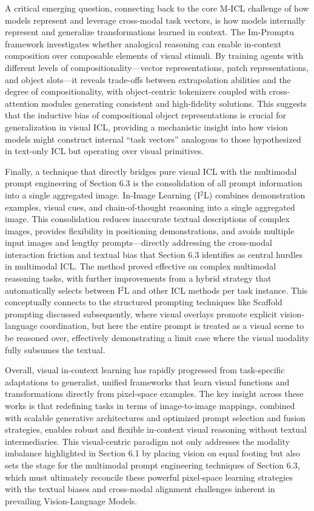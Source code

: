 \documentclass[11pt]{article}
\begin{document}
A critical emerging question, connecting back to the core M-ICL challenge of how models represent and leverage cross-modal task vectors, is how models internally represent and generalize transformations learned in context. The Im-Promptu framework \cite{ref234} investigates whether analogical reasoning can enable in-context composition over composable elements of visual stimuli. By training agents with different levels of compositionality---vector representations, patch representations, and object slots---it reveals trade-offs between extrapolation abilities and the degree of compositionality, with object-centric tokenizers coupled with cross-attention modules generating consistent and high-fidelity solutions. This suggests that the inductive bias of compositional object representations is crucial for generalization in visual ICL, providing a mechanistic insight into how vision models might construct internal ``task vectors'' analogous to those hypothesized in text-only ICL but operating over visual primitives.

Finally, a technique that directly bridges pure visual ICL with the multimodal prompt engineering of Section 6.3 is the consolidation of all prompt information into a single aggregated image. In-Image Learning (I\(^2\)L) \cite{ref235} combines demonstration examples, visual cues, and chain-of-thought reasoning into a single aggregated image. This consolidation reduces inaccurate textual descriptions of complex images, provides flexibility in positioning demonstrations, and avoids multiple input images and lengthy prompts---directly addressing the cross-modal interaction friction and textual bias that Section 6.3 identifies as central hurdles in multimodal ICL. The method proved effective on complex multimodal reasoning tasks, with further improvements from a hybrid strategy that automatically selects between I\(^2\)L and other ICL methods per task instance. This conceptually connects to the structured prompting techniques like Scaffold prompting discussed subsequently, where visual overlays promote explicit vision-language coordination, but here the entire prompt is treated as a visual scene to be reasoned over, effectively demonstrating a limit case where the visual modality fully subsumes the textual.

Overall, visual in-context learning has rapidly progressed from task-specific adaptations to generalist, unified frameworks that learn visual functions and transformations directly from pixel-space examples. The key insight across these works is that redefining tasks in terms of image-to-image mappings, combined with scalable generative architectures and optimized prompt selection and fusion strategies, enables robust and flexible in-context visual reasoning without textual intermediaries. This visual-centric paradigm not only addresses the modality imbalance highlighted in Section 6.1 by placing vision on equal footing but also sets the stage for the multimodal prompt engineering techniques of Section 6.3, which must ultimately reconcile these powerful pixel-space learning strategies with the textual biases and cross-modal alignment challenges inherent in prevailing Vision-Language Models.
\end{document}
